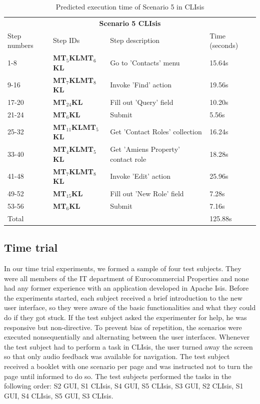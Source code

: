 \begin{table}[H]
	\center
	
	\begin{tabular}{llll}
		\toprule
		\multicolumn{4}{c}{\textbf{Scenario 5 CLIsis}} \\
		\addlinespace[0.5em]
		Step numbers & Step IDs & Step description & Time (seconds) \\
		\midrule
		1-8 		& \textbf{MT$_5$KLMT$_6$KL}		& Go to 'Contacts' menu 						& 15.64s \\
		9-16		& \textbf{MT$_7$KLMT$_8$KL}		& Invoke 'Find' action							& 19.56s \\
		17-20	& \textbf{MT$_{24}$KL}					& Fill out 'Query' field							& 10.20s \\
		21-24	& \textbf{MT$_6$KL}							& Submit												& 5.56s \\
		25-32	& \textbf{MT$_{11}$KLMT$_5$KL}	& Get 'Contact Roles' collection			& 16.24s \\
		33-40	& \textbf{MT$_4$KLMT$_5$KL}		& Get 'Amiens Property' contact role	& 18.28s \\
		41-48	& \textbf{MT$_7$KLMT$_8$KL}		& Invoke 'Edit' action							& 25.96s \\
		49-52	& \textbf{MT$_{15}$KL}					& Fill out 'New Role' field						& 7.28s \\
		53-56	& \textbf{MT$_6$KL}							& Submit												& 7.16s \\
		\midrule
		\multicolumn{3}{l}{Total}																							& 125.88s\\
		\bottomrule
	\end{tabular}
	
	\caption{Predicted execution time of Scenario 5 in CLIsis}
	\label{table:gomsscenario5clisis}
\end{table}

\subsection{Time trial}
\label{subsection:timetrial_evaluation}
In our time trial experiments, we formed a sample of four test subjects. They were all members of the IT department of Eurocommercial Properties and none had any former experience with an application developed in Apache Isis. Before the experiments started, each subject received a brief introduction to the new user interface, so they were aware of the basic functionalities and what they could do if they got stuck. If the test subject asked the experimenter for help, he was responsive but non-directive. To prevent bias of repetition, the scenarios were executed nonsequentially and alternating between the user interfaces. Whenever the test subject had to perform a task in CLIsis, the user turned away the screen so that only audio feedback was available for navigation. The test subject received a booklet with one scenario per page and was instructed not to turn the page until informed to do so. The test subjects performed the tasks in the following order: S2 GUI, S1 CLIsis, S4 GUI, S5 CLIsis, S3 GUI, S2 CLIsis, S1 GUI, S4 CLIsis, S5 GUI, S3 CLIsis.

